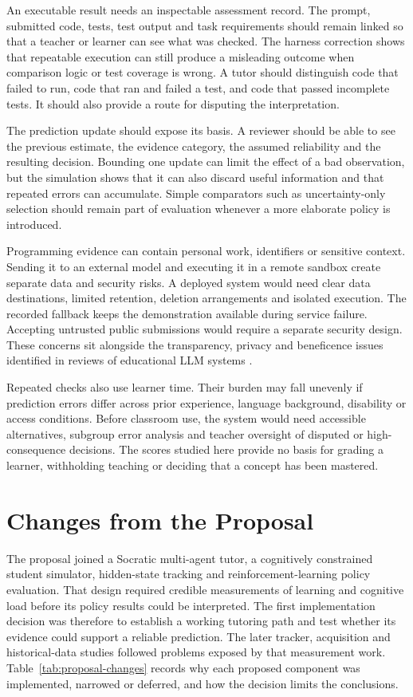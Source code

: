 An executable result needs an inspectable assessment record. The prompt, submitted code, tests, test output and task requirements
should remain linked so that a teacher or learner can see what was checked. The harness correction shows that repeatable execution
can still produce a misleading outcome when comparison logic or test coverage is wrong. A tutor should distinguish code that
failed to run, code that ran and failed a test, and code that passed incomplete tests. It should also provide a route for disputing
the interpretation.

The prediction update should expose its basis. A reviewer should be able to see the previous estimate, the evidence category,
the assumed reliability and the resulting decision. Bounding one update can limit the effect of a bad observation, but the
simulation shows that it can also discard useful information and that repeated errors can accumulate. Simple comparators such as
uncertainty-only selection should remain part of evaluation whenever a more elaborate policy is introduced.

Programming evidence can contain personal work, identifiers or sensitive context. Sending it to an external model and executing
it in a remote sandbox create separate data and security risks. A deployed system would need clear data destinations, limited
retention, deletion arrangements and isolated execution. The recorded fallback keeps the demonstration available during service
failure. Accepting untrusted public submissions would require a separate security design. These concerns sit alongside the transparency, privacy and
beneficence issues identified in reviews of educational LLM systems \parencite{yan2024practical}.

Repeated checks also use learner time. Their burden may fall unevenly if prediction errors differ across prior experience,
language background, disability or access conditions. Before classroom use, the system would need accessible alternatives,
subgroup error analysis and teacher oversight of disputed or high-consequence decisions. The scores studied here provide no
basis for grading a learner, withholding teaching or deciding that a concept has been mastered.

\section{Changes from the Proposal}

The proposal joined a Socratic multi-agent tutor, a cognitively constrained student simulator, hidden-state tracking and
reinforcement-learning policy evaluation. That design required credible measurements of learning and cognitive load before
its policy results could be interpreted. The first implementation decision was therefore to establish a working tutoring path
and test whether its evidence could support a reliable prediction. The later tracker, acquisition and historical-data studies
followed problems exposed by that measurement work. Table~\ref{tab:proposal-changes} records why each proposed component was
implemented, narrowed or deferred, and how the decision limits the conclusions.

